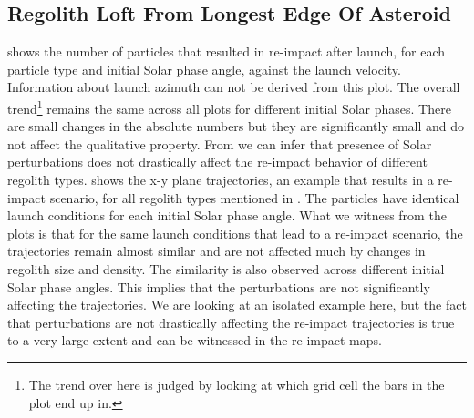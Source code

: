 \subsection{Regolith Loft From Longest Edge Of Asteroid}
\label{sec:general_char_longestEdge}
 shows the number of particles that resulted in re-impact after launch, for each particle type and initial Solar phase angle, against the launch velocity. Information about launch azimuth can not be derived from this plot. The overall trend\footnote{The trend over here is judged by looking at which grid cell the bars in the plot end up in.} remains the same across all plots for different initial Solar phases. There are small changes in the absolute numbers but they are significantly small and do not affect the qualitative property. From  we can infer that presence of Solar perturbations does not drastically affect the re-impact behavior of different regolith types.
%
\newline\newline
%
 shows the x-y plane trajectories, an example that results in a re-impact scenario, for all regolith types mentioned in . The particles have identical launch conditions for each initial Solar phase angle. What we witness from the plots is that for the same launch conditions that lead to a re-impact scenario, the trajectories remain almost similar and are not affected much by changes in regolith size and density. The similarity is also observed across different initial Solar phase angles. This implies that the perturbations are not significantly affecting the trajectories. We are looking at an isolated example here, but the fact that perturbations are not drastically affecting the re-impact trajectories is true to a very large extent and can be witnessed in the re-impact maps.
%
\newline\newline
%
